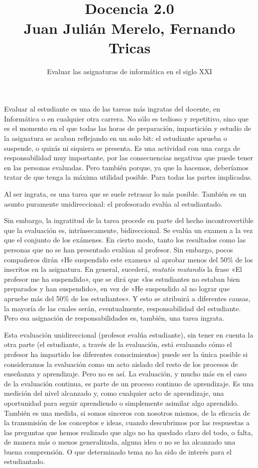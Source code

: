 \documentclass[twoside,10pt]{article}
\title{\ \\ Docencia 2.0\\ \large Juan Julián Merelo, Fernando Tricas}
\author{\LARGE Evaluar las asignaturas de informática en el siglo XXI}
\date{}
\begin{document}
\addtocounter{page}{6}

\maketitle
\vspace*{-3ex}

\begin{multicols}{2}



Evaluar al estudiante es una de las tareas más ingratas del docente,
en Informática o en cualquier otra carrera.  No sólo es tedioso y
repetitivo, sino que es el momento en el que todas las horas de
preparación, impartición y estudio de la asignatura se acaban
reflejando en un solo bit: el estudiante aprueba o suspende, o quizás
ni siquiera se presenta.  Es una actividad con una carga de
responsabilidad muy importante, por las consecuencias negativas que
puede tener en las personas evaluadas.  Pero también porque, ya que la
hacemos, deberíamos tratar de que tenga la máxima utilidad posible.
Para todas las partes implicadas.

Al ser ingrata, es una tarea que se suele retrasar lo más
posible. También es un asunto puramente unidireccional: el profesorado
evalúa al estudiantado.

Sin embargo, la ingratitud de la tarea procede en parte del hecho
incontrovertible que la evaluación es, intrínsecamente, bidireccional.
Se evalúa un examen a la vez que el conjunto de los exámenes.  En
cierto modo, tanto los resultados como las personas que no se han
presentado evalúan al profesor.  Sin embargo, pocos compañeros dirán
«He suspendido este examen» al aprobar menos del 50\% de los
inscritos en la asignatura.  En general, sucederá, {\sl mutatis
mutandis} la frase «El profesor me ha suspendido», que se dirá que
«los estudiantes no estaban bien preparados y han suspendido», en
vez de «He suspendido al no lograr que apruebe más del 50\% de los
estudiantes».  Y esto se atribuirá a diferentes causas, la mayoría de
las cuales serán, eventualmente, responsabilidad del estudiante.  Pero
esa asignación de responsabilidades es, también, una tarea ingrata.

Esta evaluación unidireccional (profesor evalúa estudiante), sin tener
en cuenta la otra parte (el estudiante, a través de la evaluación,
está evaluando cómo el profesor ha impartido los diferentes
conocimientos) puede ser la única posible si consideramos la
evaluación como un acto aislado del resto de los procesos de enseñanza
y aprendizaje.  Pero no es así.  La evaluación, y mucho más en el caso
de la evaluación continua, es parte de un proceso continuo de
aprendizaje.  Es una medición del nivel alcanzado y, como cualquier
acto de aprendizaje, una oportunidad para seguir aprendiendo o
simplemente asimilar algo aprendido.  También es una medida, si somos
sinceros con nosotros mismos, de la eficacia de la transmisión de los
conceptos e ideas, cuando descubrimos por las respuestas a las
preguntas que hemos realizado que algo no ha quedado claro del todo, o
falta, de manera más o menos generalizada, alguna idea o no se ha
alcanzado una buena comprensión.  O que determinado tema no ha sido de
interés para el estudiantado.


\end{multicols}
\end{document}
